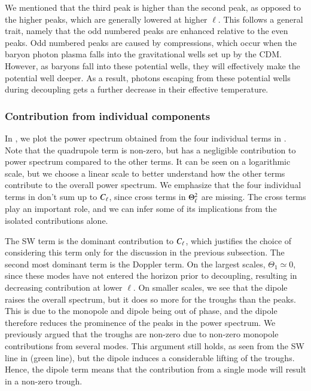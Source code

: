 We mentioned that the third peak is higher than the second peak, as opposed to the higher peaks, which are generally lowered at higher $\ell$. This follows a general trait, namely that the odd numbered peaks are enhanced relative to the even peaks. Odd numbered peaks are caused by compressions, which occur when the baryon photon plasma falls into the gravitational wells set up by the CDM. However, as baryons fall into these potential wells, they will effectively make the potential well deeper. As a result, photons escaping from these potential wells during decoupling gets a further decrease in their effective temperature.     

\subsubsection{Contribution from individual components} \label{sssec:M4:results:contribution_from_individual_components}
In , we plot the power spectrum obtained from the four individual terms in . Note that the quadrupole term is non-zero, but has a negligible contribution to power spectrum compared to the other terms. It can be seen on a logarithmic scale, but we choose a linear scale to better understand how the other terms contribute to the overall power spectrum. We emphasize that the four individual terms in  don't sum up to $C_\ell$, since cross terms in $\Theta_\ell^2$ are missing. The cross terms play an important role, and we can infer some of its implications from the isolated contributions alone.     

The SW term is the dominant contribution to $C_\ell$, which justifies the choice of considering this term only for the discussion in the previous subsection. The second most dominant term is the Doppler term. On the largest scales, $\Theta_1\simeq 0$, since these modes have not entered the horizon prior to decoupling, resulting in decreasing contribution at lower $\ell$. On smaller scales, we see that the dipole raises the overall spectrum, but it does so more for the troughs than the peaks. This is due to the monopole and dipole being out of phase, and the dipole therefore reduces the prominence of the peaks in the power spectrum. We previously argued that the troughs are non-zero due to non-zero monopole contributions from several modes. This argument still holds, as seen from the SW line in  (green line), but the dipole induces a considerable lifting of the troughs. Hence, the dipole term means that the contribution from a single mode will result in a non-zero trough.   

